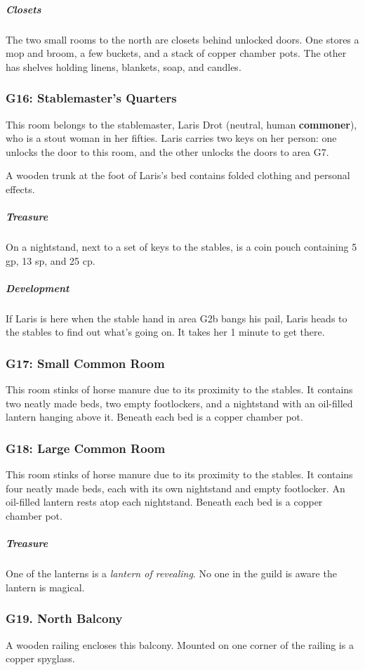 \documentclass[10pt,a4paper,twoside,bg=print,twocolumn,openany,nodeprecatedcode]{dndbook}
\begin{document}
\subparagraph{Closets}
The two small rooms to the north are closets behind unlocked doors. One stores a mop and broom, a few buckets, and a stack of copper chamber pots. The other has shelves holding linens, blankets, soap, and candles.

\subsubsection{G16: Stablemaster's Quarters}
This room belongs to the stablemaster, Laris Drot (neutral, human \textbf{commoner}), who is a stout woman in her fifties. Laris carries two keys on her person: one unlocks the door to this room, and the other unlocks the doors to area G7.

A wooden trunk at the foot of Laris's bed contains folded clothing and personal effects.

\subparagraph{Treasure}
On a nightstand, next to a set of keys to the stables, is a coin pouch containing 5 gp, 13 sp, and 25 cp.

\subparagraph{Development}
If Laris is here when the stable hand in area G2b bangs his pail, Laris heads to the stables to find out what's going on. It takes her 1 minute to get there.

\subsubsection{G17: Small Common Room}
This room stinks of horse manure due to its proximity to the stables. It contains two neatly made beds, two empty footlockers, and a nightstand with an oil-filled lantern hanging above it. Beneath each bed is a copper chamber pot.

\subsubsection{G18: Large Common Room}
This room stinks of horse manure due to its proximity to the stables. It contains four neatly made beds, each with its own nightstand and empty footlocker. An oil-filled lantern rests atop each nightstand. Beneath each bed is a copper chamber pot.

\subparagraph{Treasure}
One of the lanterns is a \textit{lantern of revealing}. No one in the guild is aware the lantern is magical.

\subsubsection{G19. North Balcony}
\begin{DndReadAloud}{}
A wooden railing encloses this balcony. Mounted on one corner of the railing is a copper spyglass.

\end{DndReadAloud}
\end{document}

